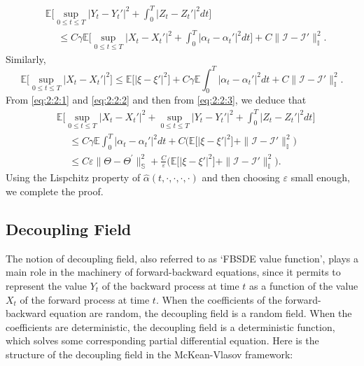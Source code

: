 \documentclass[11pt]{amsart}
\begin{document}
\begin{equation}
\label{eq:2:2:1}
\begin{split}
&{\mathbb E} \biggl[ \sup_{0 \leq t \leq T} \vert Y_{t} - Y_{t}' \vert^2 + \int_{0}^T \vert Z_{t} - Z_{t}' \vert^2 dt \biggr]
\\
&\hspace{15pt} \leq C \gamma {\mathbb E} \biggl[
\sup_{0 \leq t \leq T} \vert X_{t} - X_{t}' \vert^2
+  \int_{0}^T   \vert \alpha_{t} - \alpha_{t}' \vert^2  dt \biggr] + 
C \| {\mathcal I} - {\mathcal I}' \|_{\mathbb I}^2. 
\end{split}
\end{equation}
Similarly, 
\begin{equation}
\label{eq:2:2:2}
{\mathbb E} \bigl[ \sup_{0 \leq t \leq T} \vert X_{t} - X_{t}' \vert^2  \bigr]
\leq {\mathbb E} \bigl[ \vert \xi - \xi' \vert^2 \bigr] + C\gamma  {\mathbb E} \int_{0}^T \vert \alpha_{t} - \alpha_{t}' \vert^2 dt + C 
\|   {\mathcal I} - {\mathcal I}'\|_{\mathbb I}^2. 
\end{equation}
From \eqref{eq:2:2:1} and \eqref{eq:2:2:2} and then from \eqref{eq:2:2:3}, we deduce that 
\begin{equation}
\begin{split}
&{\mathbb E} \biggl[ \sup_{0 \leq t \leq T} \vert X_{t} - X_{t}' \vert^2 + \sup_{0 \leq t \leq T} \vert Y_{t} - Y_{t}' \vert^2 + \int_{0}^T \vert Z_{t} - Z_{t}' \vert^2 dt \biggr]
\\
&\hspace{15pt} \leq C\gamma  {\mathbb E} \int_{0}^T \vert \alpha_{t} - \alpha_{t}' \vert^2 dt + C 
\bigl( {\mathbb E} \bigl[ \vert \xi - \xi' \vert^2 \bigr] +
\|   {\mathcal I} - {\mathcal I}'\|_{\mathbb I}^2 \bigr)
\\
&\hspace{15pt} \leq  C \varepsilon 
  \| \Theta - \Theta^{\prime} \|_{\mathbb S}^2 
+ \frac{C}{\varepsilon} \bigl( {\mathbb E} \bigl[ \vert \xi - \xi' \vert^2 \bigr] +
 \| {\mathcal I} - {\mathcal I}' \|_{\mathbb I}^2 \bigr). 
\end{split}
\end{equation}
Using the Lispchitz property of $\hat{\alpha}(t,\cdot,\cdot,\cdot,\cdot)$ and then choosing $\varepsilon$ small enough, we complete the proof. 

\subsection{Decoupling Field}
The notion of decoupling field, also referred to as `FBSDE value function', plays a main role in the machinery of forward-backward equations, since it permits to represent the value $Y_{t}$
of the backward process at time $t$ as a function of the value $X_{t}$ of the forward process at time $t$. When the coefficients of the forward-backward equation are random, the decoupling field is a random field. When the coefficients are deterministic, the decoupling field is a deterministic function, which solves some corresponding partial differential equation. Here is the structure of the decoupling field in the McKean-Vlasov framework:
\end{document}
